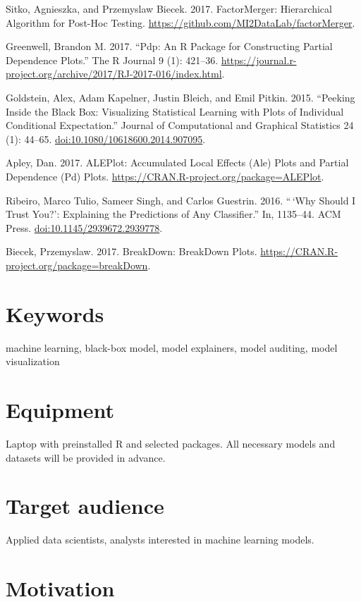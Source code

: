 \documentclass[]{book}
\theoremstyle{definition}
\theoremstyle{definition}
\theoremstyle{definition}
\theoremstyle{remark}
\begin{document}
Sitko, Agnieszka, and Przemyslaw Biecek. 2017. FactorMerger:
Hierarchical Algorithm for Post-Hoc Testing.
\url{https://github.com/MI2DataLab/factorMerger}.

Greenwell, Brandon M. 2017. ``Pdp: An R Package for Constructing Partial
Dependence Plots.'' The R Journal 9 (1): 421--36.
\url{https://journal.r-project.org/archive/2017/RJ-2017-016/index.html}.

Goldstein, Alex, Adam Kapelner, Justin Bleich, and Emil Pitkin. 2015.
``Peeking Inside the Black Box: Visualizing Statistical Learning with
Plots of Individual Conditional Expectation.'' Journal of Computational
and Graphical Statistics 24 (1): 44--65.
\url{doi:10.1080/10618600.2014.907095}.

Apley, Dan. 2017. ALEPlot: Accumulated Local Effects (Ale) Plots and
Partial Dependence (Pd) Plots.
\url{https://CRAN.R-project.org/package=ALEPlot}.

Ribeiro, Marco Tulio, Sameer Singh, and Carlos Guestrin. 2016. ``\,`Why
Should I Trust You?': Explaining the Predictions of Any Classifier.''
In, 1135--44. ACM Press. \url{doi:10.1145/2939672.2939778}.

Biecek, Przemyslaw. 2017. BreakDown: BreakDown Plots.
\url{https://CRAN.R-project.org/package=breakDown}.

\section{Keywords}\label{keywords}

machine learning, black-box model, model explainers, model auditing,
model visualization

\section{Equipment}\label{equipment}

Laptop with preinstalled R and selected packages. All necessary models
and datasets will be provided in advance.

\section{Target audience}\label{target-audience}

Applied data scientists, analysts interested in machine learning models.

\section{Motivation}\label{motivation-1}
\end{document}

